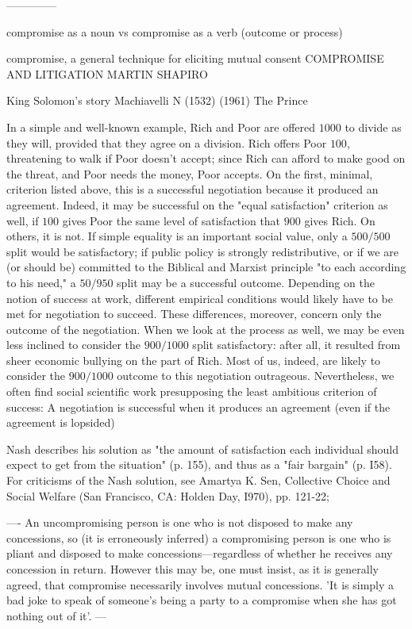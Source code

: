 --------------

compromise as a noun vs compromise as a verb (outcome or process)

compromise, a general technique for eliciting mutual consent  COMPROMISE AND LITIGATION MARTIN SHAPIRO \cite{Shapiro1979}

King Solomon’s story
Machiavelli N (1532) (1961) The Prince

\cite{Luban1985}
In a simple and well-known example, Rich and Poor are offered $1000$ to divide as they will, provided that they agree on a division. Rich offers Poor $100$, threatening to walk if Poor doesn't accept; since Rich can afford to make good on the threat, and Poor needs the money, Poor accepts. On the first, minimal, criterion listed above, this is a successful negotiation because it produced an agreement. Indeed, it may be successful on the "equal satisfaction" criterion as well, if $100$ gives Poor the same level of satisfaction that $900$ gives Rich. On others, it is not. If simple equality is an important social value, only a $500/500$ split would be satisfactory; if public policy is strongly redistributive, or if we are (or should be) committed to the Biblical and Marxist principle "to each according to his need," a $50/950$ split may be a successful outcome. Depending on the notion of success at work, different empirical conditions would likely have to be met for negotiation to succeed. These differences, moreover, concern only the outcome of the negotiation. When we look at the process as well, we may be even less inclined to consider the $900/1000$ split satisfactory: after all, it resulted from sheer economic bullying on the part of Rich. Most of us, indeed, are likely
to consider the $900/1000$ outcome to this negotiation outrageous. Nevertheless, we often find social scientific work presupposing the least ambitious criterion of success: A negotiation is successful when it produces an agreement (even if the agreement is lopsided)


Nash describes his solution as "the amount of satisfaction each individual should expect to get from the situation" (p. 155), and thus as a
"fair bargain" (p. I58).
For criticisms of the Nash solution, see Amartya K. Sen, Collective Choice and Social
Welfare (San Francisco, CA: Holden Day, I970), pp. 121-22;

----
\cite{Day1989}
An uncompromising person is one who is not disposed to make any concessions, so (it is erroneously inferred) a compromising person is one who is pliant and disposed to make concessions—regardless of whether he receives any concession in return. However this may be, one must insist, as it is generally agreed, that compromise necessarily involves mutual concessions. 'It is simply a bad joke to speak of someone's being a party to a compromise when she has got nothing out of it'. \cite{Braybrooke1982}
---

